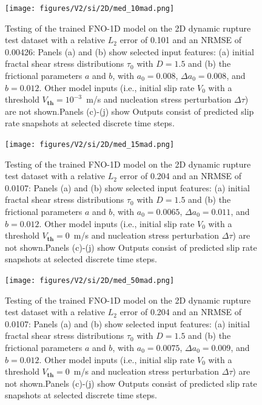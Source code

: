 \documentclass[a4paper,11pt]{article}
\begin{document}
\begin{figure}[H]
    \centering
    \texttt{[image: figures/V2/si/2D/med\_10mad.png]}
    \caption{\label{fig:2D_mu_5std}Testing of the trained FNO-1D model on the 2D dynamic rupture test dataset with a relative \(L_2\) error of 0.101 and an NRMSE of 0.00426: Panels (a) and (b) show selected input features: (a) initial fractal shear stress distributions \(\tau_{0}\) with \(D=1.5\) and (b) the frictional parameters \(a\) and \(b\), with \(a_0 = 0.008\), \(\Delta a_0 = 0.008\), and \(b=0.012\). Other model inputs (i.e., initial slip rate \(V_0\) with  a threshold \(V_\textbf{th} = 10^{-3}\)~m/s and nucleation stress perturbation \(\Delta \tau\)) are not shown.Panels (c)-(j) show Outputs consist of predicted slip rate snapshots at selected discrete time steps.}
\end{figure}

\begin{figure}[H]
    \centering
    \texttt{[image: figures/V2/si/2D/med\_15mad.png]}
    \caption{\label{fig:2D_mu_8std}Testing of the trained FNO-1D model on the 2D dynamic rupture test dataset with a relative \(L_2\) error of 0.204 and an NRMSE of 0.0107: Panels (a) and (b) show selected input features: (a) initial fractal shear stress distributions \(\tau_{0}\) with \(D=1.5\) and (b) the frictional parameters \(a\) and \(b\), with \(a_0 = 0.0065\), \(\Delta a_0 = 0.011\), and \(b=0.012\). Other model inputs (i.e., initial slip rate \(V_0\) with  a threshold \(V_\textbf{th} = 0\)~m/s and nucleation stress perturbation \(\Delta \tau\)) are not shown.Panels (c)-(j) show Outputs consist of predicted slip rate snapshots at selected discrete time steps.}
\end{figure}

\begin{figure}[H]
    \centering
    \texttt{[image: figures/V2/si/2D/med\_50mad.png]}
    \caption{\label{fig:2D_mu_10std}Testing of the trained FNO-1D model on the 2D dynamic rupture test dataset with a relative \(L_2\) error of 0.204 and an NRMSE of 0.0107: Panels (a) and (b) show selected input features: (a) initial fractal shear stress distributions \(\tau_{0}\) with \(D=1.5\) and (b) the frictional parameters \(a\) and \(b\), with \(a_0 = 0.0075\), \(\Delta a_0 = 0.009\), and \(b=0.012\). Other model inputs (i.e., initial slip rate \(V_0\) with  a threshold \(V_\textbf{th} = 0\)~m/s and nucleation stress perturbation \(\Delta \tau\)) are not shown.Panels (c)-(j) show Outputs consist of predicted slip rate snapshots at selected discrete time steps.}
\end{figure}
\end{document}
